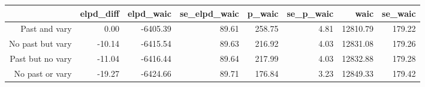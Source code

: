 \begin{table}[ht]
\centering
\begin{tabular}{rrrrrrrr}
  \hline
 & elpd\_diff & elpd\_waic & se\_elpd\_waic & p\_waic & se\_p\_waic & waic & se\_waic \\ 
  \hline
Past and vary & 0.00 & -6405.39 & 89.61 & 258.75 & 4.81 & 12810.79 & 179.22 \\ 
  No past but vary & -10.14 & -6415.54 & 89.63 & 216.92 & 4.03 & 12831.08 & 179.26 \\ 
  Past but no vary & -11.04 & -6416.44 & 89.64 & 217.99 & 4.03 & 12832.88 & 179.28 \\ 
  No past or vary & -19.27 & -6424.66 & 89.71 & 176.84 & 3.23 & 12849.33 & 179.42 \\ 
   \hline
\end{tabular}
\end{table}
